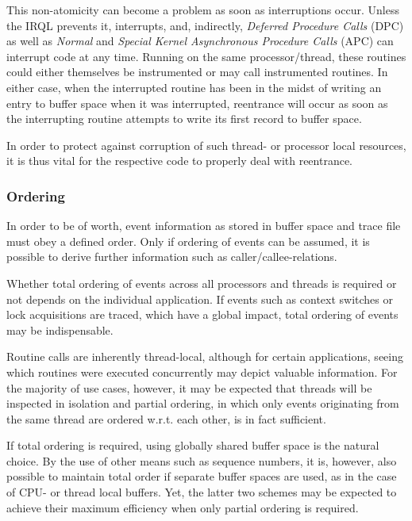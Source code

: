 This non-atomicity can become a problem as soon as interruptions occur. Unless 
the IRQL prevents it, interrupts, and, indirectly, \emph{Deferred Procedure Calls} (DPC)
as well as \emph{Normal} and \emph{Special Kernel Asynchronous Procedure Calls} (APC) can
interrupt code at any time. Running on the same processor/thread, these routines 
could either themselves be instrumented or may call instrumented routines.
In either case, when the interrupted routine has been in the midst of writing an 
entry to buffer space when it was interrupted, reentrance will occur as soon
as the interrupting routine attempts to write its first record to buffer space.

In order to protect against corruption of such thread- or processor local resources,
it is thus vital for the respective code to properly deal with reentrance.

\subsubsection{Ordering}
In order to be of worth, event information as stored in buffer space and trace 
file must obey a defined order. Only if ordering of events can be assumed, it is
possible to derive further information such as caller/callee-relations.

Whether total ordering of events across all processors and threads is required
or not depends on the individual application. If events such as context switches
or lock acquisitions are traced, which have a global impact, total ordering of
events may be indispensable.

Routine calls are inherently thread-local, although for certain applications,
seeing which routines were executed concurrently may depict valuable information.
For the majority of use cases, however, it may be expected that threads will be
inspected in isolation and partial ordering, in which only events originating 
from the same thread are ordered w.r.t. each other, is in fact sufficient.

If total ordering is required, using globally shared buffer space is the natural
choice. By the use of other means such as sequence numbers, it is, however,
also possible to maintain total order if separate buffer spaces are used, as
in the case of CPU- or thread local buffers. Yet, the latter two schemes may be
expected to achieve their maximum efficiency when only partial ordering is required.

